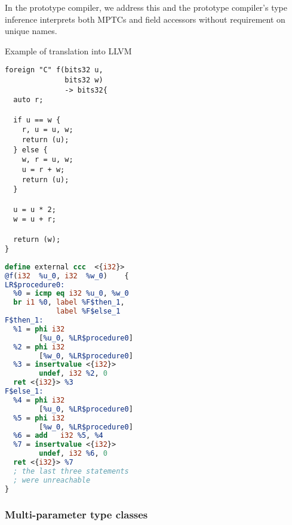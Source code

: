 In the prototype compiler, we address this and the prototype compiler's type inference interprets both MPTCs and field accessors without requirement on unique names.
\begin{listing}
    \small
    \caption{Example of translation into LLVM}
    \label{lst:translex}
    \begin{center}
    \begin{minipage}{0.5\linewidth}
    \begin{lstlisting}
foreign "C" f(bits32 u,
              bits32 w)
              -> bits32{
  auto r;

  if u == w {
    r, u = u, w;
    return (u);
  } else {
    w, r = u, w;
    u = r + w;
    return (u);
  }

  u = u * 2;
  w = u + r;

  return (w);
}
    \end{lstlisting}
    \end{minipage}%
    \begin{minipage}{0.5\linewidth}
    \begin{lstlisting}[language=LLVM]
define external ccc  <{i32}>
@f(i32  %u_0, i32  %w_0)    {
LR$procedure0:
  %0 = icmp eq i32 %u_0, %w_0
  br i1 %0, label %F$then_1,
            label %F$else_1
F$then_1:
  %1 = phi i32
        [%u_0, %LR$procedure0]
  %2 = phi i32
        [%w_0, %LR$procedure0]
  %3 = insertvalue <{i32}>
        undef, i32 %2, 0
  ret <{i32}> %3
F$else_1:
  %4 = phi i32
        [%u_0, %LR$procedure0]
  %5 = phi i32
        [%w_0, %LR$procedure0]
  %6 = add   i32 %5, %4
  %7 = insertvalue <{i32}>
        undef, i32 %6, 0
  ret <{i32}> %7
  ; the last three statements
  ; were unreachable
}
    \end{lstlisting}
    \end{minipage}
    \end{center}
\end{listing}
\subsubsection{Multi-parameter type classes}

